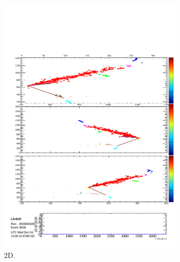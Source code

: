 \begin{figure}
  \centering
  \begin{subfigure}[t]{0.48\linewidth}
    \centering
    \includegraphics[width=0.98\textwidth]{NuECCTrackShower2D.pdf}
    \caption{2D.}
    \label{fig:nueCCRecon2D}
  \end{subfigure}
  \hfill
  \begin{subfigure}[t]{0.48\linewidth}
    \centering

\end{subfigure}
\end{figure}
